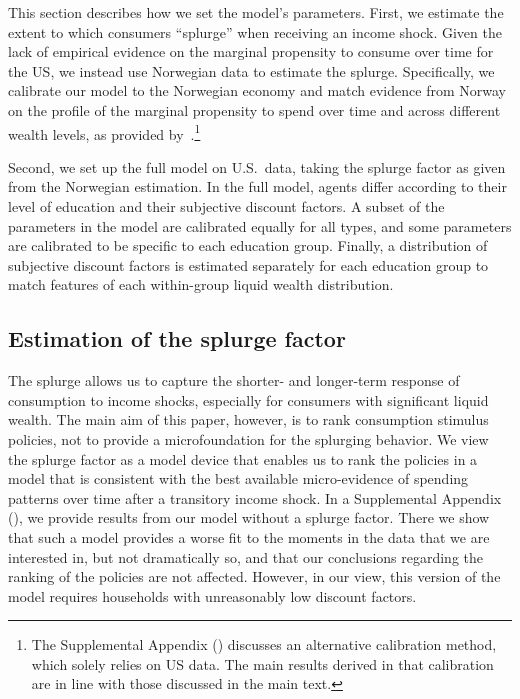 \documentclass[qe,draft]{econsocart}
\theoremstyle{plain}
\theoremstyle{definition}
\begin{document}
This section describes how we set the model's parameters. First, we estimate the extent to which consumers ``splurge'' when receiving an income shock. Given the lack of empirical evidence on the marginal propensity to consume over time for the US, we instead use Norwegian data to estimate the splurge. Specifically, we calibrate our model to the Norwegian economy and match evidence from Norway on the profile of the marginal propensity to spend over time and across different wealth levels, as provided by~\cite{fagereng-mpc-2021}.\footnote{The Supplemental Appendix (\cite{carroll2026welfareSupplement}) discusses an alternative calibration method, which solely relies on US data. The main results derived in that calibration are in line with those discussed in the main text.}

Second, we set up the full model on U.S.\ data, taking the splurge factor as given from the Norwegian estimation. In the full model, agents differ according to their level of education and their subjective discount factors. A subset of the parameters in the model are calibrated equally for all types, and some parameters are calibrated to be specific to each education group. Finally, a distribution of subjective discount factors is estimated separately for each education group to match features of each within-group liquid wealth distribution.

\subsection{Estimation of the splurge factor}
\label{sec:splurge}

The splurge allows us to capture the shorter- and longer-term response of consumption to income shocks, especially for consumers with significant liquid wealth. The main aim of this paper, however, is to rank consumption stimulus policies, not to provide a microfoundation for the splurging behavior. We view the splurge factor as a model device that enables us to rank the policies in a model that is consistent with the best available micro-evidence of spending patterns over time after a transitory income shock. In a Supplemental Appendix (\cite{carroll2026welfareSupplement}), we provide results from our model without a splurge factor. There we show that such a model provides a worse fit to the moments in the data that we are interested in, but not dramatically so, and that our conclusions regarding the ranking of the policies are not affected. However, in our view, this version of the model requires households with unreasonably low discount factors.
\end{document}
